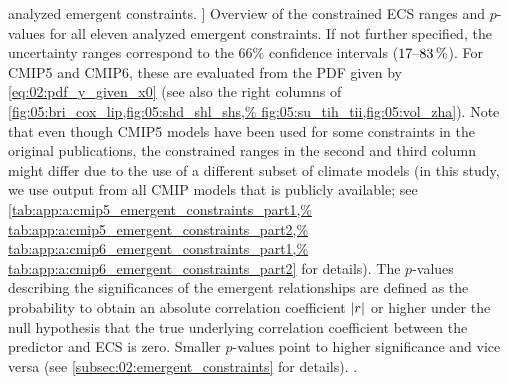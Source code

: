 \begin{table}[!b]
    analyzed emergent constraints.
  ]{
    Overview of the constrained \acf{ECS} ranges and $p$-values for all eleven
    analyzed emergent constraints. If not further specified, the uncertainty
    ranges correspond to the $66 \unit{\%}$ confidence intervals
    ($\rangeunit{17}{83}{\%}$). For \acs{CMIP}5 and \acs{CMIP}6, these are
    evaluated from the \acl{PDF} given by \cref{eq:02:pdf_y_given_x0} (see also
    the right columns of \cref{fig:05:bri_cox_lip,fig:05:shd_shl_shs,%
      fig:05:su_tih_tii,fig:05:vol_zha}). Note that even though \acs{CMIP}5
    models have been used for some constraints in the original publications,
    the constrained ranges in the second and third column might differ due to
    the use of a different subset of climate models (in this study, we use
    output from all \acs{CMIP} models that is publicly available; see
    \cref{tab:app:a:cmip5_emergent_constraints_part1,%
      tab:app:a:cmip5_emergent_constraints_part2,%
      tab:app:a:cmip6_emergent_constraints_part1,%
      tab:app:a:cmip6_emergent_constraints_part2} for details). The $p$-values
    describing the significances of the emergent relationships are defined as
    the probability to obtain an absolute correlation coefficient $\abs*{r}$
    or higher under the null hypothesis that the true underlying correlation
    coefficient between the predictor and \acs{ECS} is zero. Smaller
    $p$-values point to higher significance and vice versa (see
    \cref{subsec:02:emergent_constraints} for details).
    .
  }
  \label{tab:05:overview_results}
\end{table}

